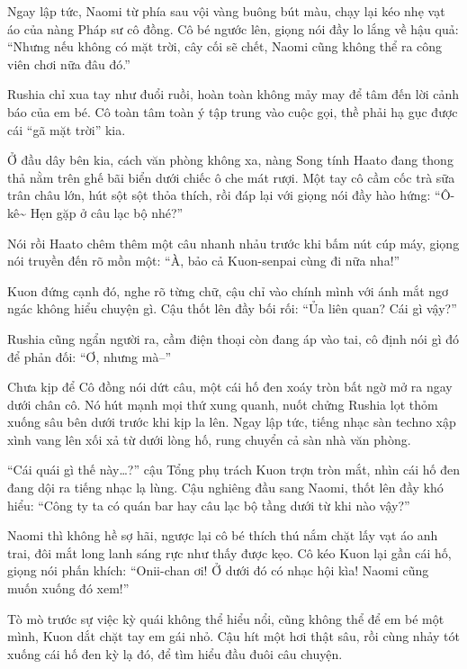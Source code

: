 \documentclass[../main.tex]{subfiles}
\begin{document}
Ngay lập tức, Naomi từ phía sau vội vàng buông bút màu, chạy lại kéo nhẹ vạt áo của nàng Pháp sư cô đồng. Cô bé ngước lên, giọng nói đầy lo lắng về hậu quả: ``Nhưng nếu không có mặt trời, cây cối sẽ chết, Naomi cũng không thể ra công viên chơi nữa đâu đó.''

Rushia chỉ xua tay như đuổi ruồi, hoàn toàn không mảy may để tâm đến lời cảnh báo của em bé. Cô toàn tâm toàn ý tập trung vào cuộc gọi, thề phải hạ gục được cái ``gã mặt trời'' kia.

Ở đầu dây bên kia, cách văn phòng không xa, nàng Song tính Haato đang thong thả nằm trên ghế bãi biển dưới chiếc ô che mát rượi. Một tay cô cầm cốc trà sữa trân châu lớn, hút sột sột thỏa thích, rồi đáp lại với giọng nói đầy hào hứng: ``Ô-kê\~{} Hẹn gặp ở câu lạc bộ nhé?''


Nói rồi Haato chêm thêm một câu nhanh nhảu trước khi bấm nút cúp máy, giọng nói truyền đến rõ mồn một: ``À, bảo cả Kuon-senpai cùng đi nữa nha!''

Kuon đứng cạnh đó, nghe rõ từng chữ, cậu chỉ vào chính mình với ánh mắt ngơ ngác không hiểu chuyện gì. Cậu thốt lên đầy bối rối: ``Ủa liên quan? Cái gì vậy?''

Rushia cũng ngẩn người ra, cầm điện thoại còn đang áp vào tai, cô định nói gì đó để phản đối: ``Ơ, nhưng mà--''

Chưa kịp để Cô đồng nói dứt câu, một cái hố đen xoáy tròn bất ngờ mở ra ngay dưới chân cô. Nó hút mạnh mọi thứ xung quanh, nuốt chửng Rushia lọt thỏm xuống sâu bên dưới trước khi kịp la lên. Ngay lập tức, tiếng nhạc sàn techno xập xình vang lên xối xả từ dưới lòng hố, rung chuyển cả sàn nhà văn phòng.

``Cái quái gì thế này\dots?'' cậu Tổng phụ trách Kuon trợn tròn mắt, nhìn cái hố đen đang dội ra tiếng nhạc lạ lùng. Cậu nghiêng đầu sang Naomi, thốt lên đầy khó hiểu: ``Công ty ta có quán bar hay câu lạc bộ tầng dưới từ khi nào vậy?''

Naomi thì không hề sợ hãi, ngược lại cô bé thích thú nắm chặt lấy vạt áo anh trai, đôi mắt long lanh sáng rực như thấy được kẹo. Cô kéo Kuon lại gần cái hố, giọng nói phấn khích: ``Onii-chan ơi! Ở dưới đó có nhạc hội kìa! Naomi cũng muốn xuống đó xem!''

Tò mò trước sự việc kỳ quái không thể hiểu nổi, cũng không thể để em bé một mình, Kuon dắt chặt tay em gái nhỏ. Cậu hít một hơi thật sâu, rồi cùng nhảy tót xuống cái hố đen kỳ lạ đó, để tìm hiểu đầu đuôi câu chuyện.
\end{document}
